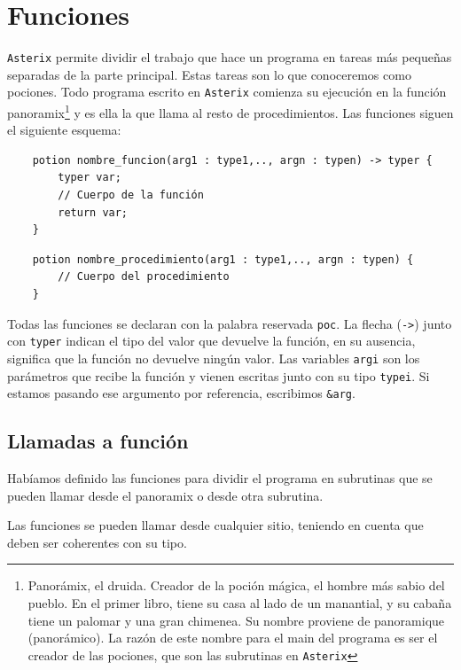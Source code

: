 \documentclass[a4paper, 10pt]{article}
\newcommand{\atx}{\texttt{Asterix} }
\begin{document}
    \section*{Funciones}
    \atx permite dividir el trabajo que hace un programa en tareas más
    pequeñas separadas de la parte principal. Estas tareas son lo que conoceremos
    como pociones. Todo programa escrito en \atx comienza su ejecución en la
    función \textsf{panoramix}\footnote{Panorámix, el druida. Creador de la
    poción mágica, el hombre más sabio del pueblo. En el primer libro, tiene su
    casa al lado de un manantial, y su cabaña tiene un palomar y una gran
    chimenea. Su nombre proviene de panoramique (panorámico). La razón de este
    nombre para el main del programa es ser el creador de las pociones, que son
    las subrutinas en \atx} y es ella la que llama al resto de procedimientos.
    Las funciones siguen el siguiente esquema: 

    \begin{verbatim}
    potion nombre_funcion(arg1 : type1,.., argn : typen) -> typer {
        typer var;
        // Cuerpo de la función
        return var; 
    }
    \end{verbatim}

    \begin{verbatim}
    potion nombre_procedimiento(arg1 : type1,.., argn : typen) {
        // Cuerpo del procedimiento
    }
    \end{verbatim}
    
    Todas las funciones se declaran con la palabra reservada \texttt{poc}. La
    flecha (\texttt{->}) junto con \texttt{typer} indican el tipo del valor que
    devuelve la función, en su ausencia, significa que la función no devuelve
    ningún valor. Las variables \texttt{argi} son los parámetros que recibe la
    función y vienen escritas junto con su tipo \texttt{typei}. Si estamos
    pasando ese argumento por referencia, escribimos \texttt{\&arg}.
    
    \subsection*{Llamadas a función}
    Habíamos definido las funciones para dividir el programa en subrutinas que
    se pueden llamar desde el \textsf{panoramix} o desde otra subrutina.
    
    Las funciones se pueden llamar desde cualquier sitio, teniendo en cuenta
    que deben ser coherentes con su tipo.
    
\end{document}
